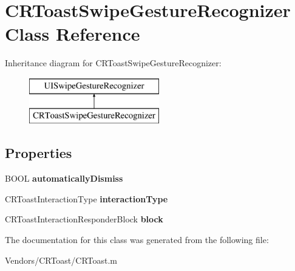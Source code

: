 \hypertarget{interface_c_r_toast_swipe_gesture_recognizer}{}\section{C\+R\+Toast\+Swipe\+Gesture\+Recognizer Class Reference}
\label{interface_c_r_toast_swipe_gesture_recognizer}
Inheritance diagram for C\+R\+Toast\+Swipe\+Gesture\+Recognizer\+:\begin{figure}[H]
\begin{center}
\leavevmode
\includegraphics[height=2.000000cm]{interface_c_r_toast_swipe_gesture_recognizer}
\end{center}
\end{figure}
\subsection*{Properties}
\begin{DoxyCompactItemize}
\item 
\hypertarget{interface_c_r_toast_swipe_gesture_recognizer_aae3d643f864e88bd34ad0d2681b20332}{}B\+O\+O\+L {\bfseries automatically\+Dismiss}\label{interface_c_r_toast_swipe_gesture_recognizer_aae3d643f864e88bd34ad0d2681b20332}

\item 
\hypertarget{interface_c_r_toast_swipe_gesture_recognizer_a797d4b9af2bbdd49117e30bed79a0c2e}{}C\+R\+Toast\+Interaction\+Type {\bfseries interaction\+Type}\label{interface_c_r_toast_swipe_gesture_recognizer_a797d4b9af2bbdd49117e30bed79a0c2e}

\item 
\hypertarget{interface_c_r_toast_swipe_gesture_recognizer_a1e127d1f5203d8983b11fa65b051c037}{}C\+R\+Toast\+Interaction\+Responder\+Block {\bfseries block}\label{interface_c_r_toast_swipe_gesture_recognizer_a1e127d1f5203d8983b11fa65b051c037}

\end{DoxyCompactItemize}


The documentation for this class was generated from the following file\+:\begin{DoxyCompactItemize}
\item 
Vendors/\+C\+R\+Toast/C\+R\+Toast.\+m\end{DoxyCompactItemize}
